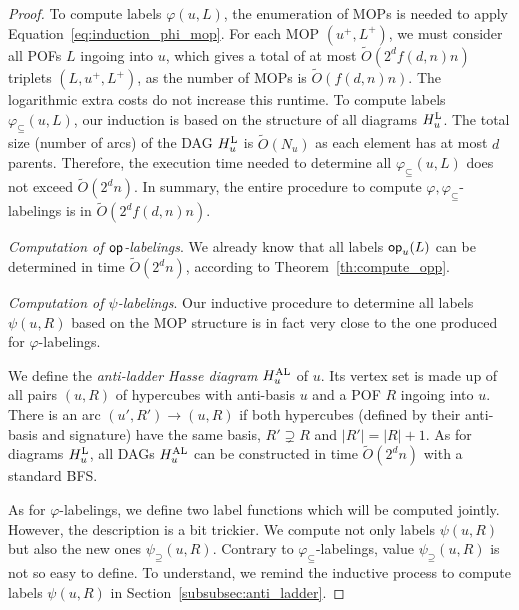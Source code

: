 \documentclass{article}
\newcommand{\card}[1]{\left| #1 \right|}
\newcommand{\opp}{\mbox{\textsf{op}}}
\newcommand{\hul}{H_u^{\mbox{\scriptsize{L}}}}
\newcommand{\hual}{H_u^{\mbox{\scriptsize{AL}}}}
\newcommand{\varphis}{\varphi_{\subseteq}}
\newcommand{\psis}{\psi_{\supseteq}}
\begin{document}
\begin{proof}
To compute labels $\varphi(u,L)$, the enumeration of MOPs is needed to apply Equation~\eqref{eq:induction_phi_mop}. For each MOP $(u^+,L^+)$, we must consider all POFs $L$ ingoing into $u$, which gives a total of at most $\tilde{O}(2^df(d,n)n)$ triplets $(L,u^+,L^+)$, as the number of MOPs is $\tilde{O}(f(d,n)n)$. The logarithmic extra costs do not increase this runtime. To compute labels $\varphis(u,L)$, our induction is based on the structure of all diagrams $\hul$. The total size (number of arcs) of the DAG $\hul$ is $\tilde{O}(N_u)$ as each element has at most $d$ parents. Therefore, the execution time needed to determine all $\varphis(u,L)$ does not exceed $\tilde{O}(2^dn)$. In summary, the entire procedure to compute $\varphi,\varphis$-labelings is in $\tilde{O}(2^df(d,n)n)$.

\textit{Computation of $\opp$-labelings}. We already know that all labels $\opp_u(L)$ can be determined in time $\tilde{O}(2^dn)$, according to Theorem~\ref{th:compute_opp}.

\textit{Computation of $\psi$-labelings}. Our inductive procedure to determine all labels $\psi(u,R)$ based on the MOP structure is in fact very close to the one produced for $\varphi$-labelings.

We define the \textit{anti-ladder Hasse diagram} $\hual$ of $u$. Its vertex set is made up of all pairs $(u,R)$ of hypercubes with anti-basis $u$ and a POF $R$ ingoing into $u$. There is an arc $(u',R')\rightarrow (u,R)$ if both hypercubes (defined by their anti-basis and signature) have the same basis, $R' \supsetneq R$ and $\card{R'} = \card{R} + 1$. As for diagrams $\hul$, all DAGs $\hual$ can be constructed in time $\tilde{O}(2^dn)$ with a standard BFS.

As for $\varphi$-labelings, we define two label functions which will be computed jointly. However, the description is a bit trickier. We compute not only labels $\psi(u,R)$ but also the new ones $\psis(u,R)$. Contrary to $\varphis$-labelings, value $\psis(u,R)$ is not so easy to define. To understand, we remind the inductive process to compute labels $\psi(u,R)$ in Section~\ref{subsubsec:anti_ladder}.


\end{proof}
\end{document}
